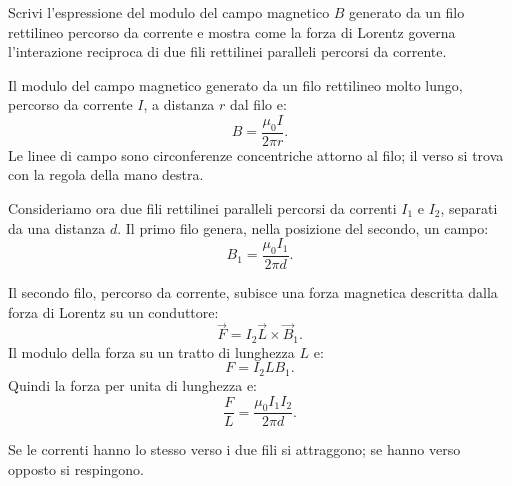 
\begin{esercizio}
Scrivi l'espressione del modulo del campo magnetico \(B\) generato da un filo
rettilineo percorso da corrente e mostra come la forza di Lorentz governa
l'interazione reciproca di due fili rettilinei paralleli percorsi da corrente.
\end{esercizio}

\begin{soluzione}
Il modulo del campo magnetico generato da un filo rettilineo molto lungo,
percorso da corrente \(I\), a distanza \(r\) dal filo e:
\[
B=\frac{\mu_0 I}{2\pi r}.
\]
Le linee di campo sono circonferenze concentriche attorno al filo; il verso si
trova con la regola della mano destra.

Consideriamo ora due fili rettilinei paralleli percorsi da correnti \(I_1\) e
\(I_2\), separati da una distanza \(d\). Il primo filo genera, nella posizione
del secondo, un campo:
\[
B_1=\frac{\mu_0 I_1}{2\pi d}.
\]

Il secondo filo, percorso da corrente, subisce una forza magnetica descritta
dalla forza di Lorentz su un conduttore:
\[
\vec F=I_2\vec L\times \vec B_1.
\]
Il modulo della forza su un tratto di lunghezza \(L\) e:
\[
F=I_2LB_1.
\]
Quindi la forza per unita di lunghezza e:
\[
\frac{F}{L}=\frac{\mu_0 I_1I_2}{2\pi d}.
\]

Se le correnti hanno lo stesso verso i due fili si attraggono; se hanno verso
opposto si respingono.
\end{soluzione}
